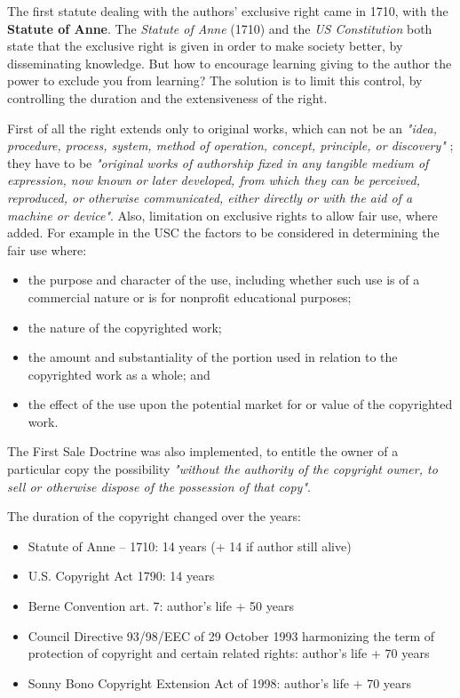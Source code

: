 \documentclass[a4paper, 10pt, titlepage]{article}
\begin{document}
The first statute dealing with the authors' exclusive right came in 1710, with the \textbf{Statute of Anne}.
The \textit{Statute of Anne} (1710) and the \textit{US Constitution} both state that the exclusive right is given in order to make society better, by disseminating knowledge. But how to encourage learning giving to the author the power to exclude you from learning? The solution is to limit this control, by controlling the duration and the extensiveness of the right. 

First of all the right extends only to original works, which can not be an \textit{"idea, procedure, process, system, method of operation,
concept, principle, or discovery" }; they have to be \textit{"original works of authorship fixed in any tangible medium
of expression, now known or later developed, from which they can be perceived, reproduced, or otherwise communicated, either directly or with the aid of a machine or device"}.
Also, limitation on exclusive rights to allow fair use, where added. For example in the USC the factors to be considered in determining the fair use where:
\begin{itemize}
\item the purpose and character of the use, including whether such use is of a commercial nature or is for nonprofit educational purposes;
\item the nature of the copyrighted work;
\item the amount and substantiality of the portion used in relation to the copyrighted work as a whole; and
\item the effect of the use upon the potential market for or value of the copyrighted work.
\end{itemize}
The First Sale Doctrine was also implemented, to entitle the owner of a particular copy the possibility \textit{"without the authority of the copyright owner, to sell or otherwise dispose of the possession of that copy"}.

The duration of the copyright changed over the years:
\begin{itemize}
\item Statute of Anne – 1710: 14 years (+ 14 if author still alive)
\item U.S. Copyright Act 1790: 14 years
\item Berne Convention art. 7: author's life + 50 years
\item Council Directive 93/98/EEC of 29 October 1993 harmonizing the term of protection of copyright and certain related rights: author's life + 70 years
\item Sonny Bono Copyright Extension Act of 1998: author's life + 70 years
\end{itemize}
\end{document}
